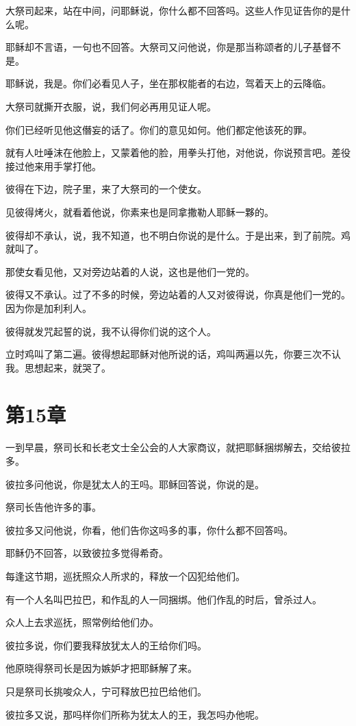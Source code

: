 \documentclass[12pt,oneside]{book}
\begin{document}
大祭司起来，站在中间，问耶稣说，你什么都不回答吗。这些人作见证告你的是什么呢。

耶稣却不言语，一句也不回答。大祭司又问他说，你是那当称颂者的儿子基督不是。

耶稣说，我是。你们必看见人子，坐在那权能者的右边，驾着天上的云降临。

大祭司就撕开衣服，说，我们何必再用见证人呢。

你们已经听见他这僭妄的话了。你们的意见如何。他们都定他该死的罪。

就有人吐唾沫在他脸上，又蒙着他的脸，用拳头打他，对他说，你说预言吧。差役接过他来用手掌打他。

彼得在下边，院子里，来了大祭司的一个使女。

见彼得烤火，就看着他说，你素来也是同拿撒勒人耶稣一夥的。

彼得却不承认，说，我不知道，也不明白你说的是什么。于是出来，到了前院。鸡就叫了。

那使女看见他，又对旁边站着的人说，这也是他们一党的。

彼得又不承认。过了不多的时候，旁边站着的人又对彼得说，你真是他们一党的。因为你是加利利人。

彼得就发咒起誓的说，我不认得你们说的这个人。

立时鸡叫了第二遍。彼得想起耶稣对他所说的话，鸡叫两遍以先，你要三次不认我。思想起来，就哭了。

\chapter{第15章}
一到早晨，祭司长和长老文士全公会的人大家商议，就把耶稣捆绑解去，交给彼拉多。

彼拉多问他说，你是犹太人的王吗。耶稣回答说，你说的是。

祭司长告他许多的事。

彼拉多又问他说，你看，他们告你这吗多的事，你什么都不回答吗。

耶稣仍不回答，以致彼拉多觉得希奇。

每逢这节期，巡抚照众人所求的，释放一个囚犯给他们。

有一个人名叫巴拉巴，和作乱的人一同捆绑。他们作乱的时后，曾杀过人。

众人上去求巡抚，照常例给他们办。

彼拉多说，你们要我释放犹太人的王给你们吗。

他原晓得祭司长是因为嫉妒才把耶稣解了来。

只是祭司长挑唆众人，宁可释放巴拉巴给他们。

彼拉多又说，那吗样你们所称为犹太人的王，我怎吗办他呢。
\end{document}

